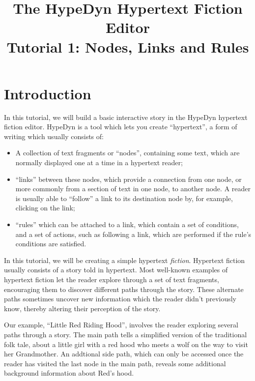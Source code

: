 \documentclass{article}
\begin{document}
\title{The HypeDyn Hypertext Fiction Editor\\Tutorial 1: Nodes, Links and Rules}
\date{}

\onecolumn
\maketitle

\tableofcontents


\section{Introduction}
In this tutorial, we will build a basic interactive story in the HypeDyn
hypertext fiction editor. HypeDyn is a tool which lets you create ``hypertext'',
a form of writing which usually consists of:

\begin{itemize}
  \item A collection of text fragments or ``nodes'', containing some text, which
  are normally displayed one at a time in a hypertext reader;
  \item ``links'' between these nodes, which provide a connection from one node,
  or more commonly from a section of text in one node, to another node. A reader
  is usually able to ``follow'' a link to its destination node by, for example,
  clicking on the link; 
  \item ``rules'' which can be attached to a link, which contain
  a set of conditions, and a set of actions, such as following a link, which
  are performed if the rule's conditions are satisfied.
\end{itemize}

In this tutorial, we will be creating a simple hypertext \textit{fiction}.
Hypertext fiction usually consists of a story told in hypertext. Most well-known
examples of hypertext fiction let the reader explore through a set of text
fragments, encouraging them to discover different paths through the story. These
alternate paths sometimes uncover new information which the reader didn't
previously know, thereby altering their perception of the story.

Our example, ``Little Red Riding Hood'', involves the reader exploring several
paths through a story. The main path tells a simplified version of the
traditional folk tale, about a little girl with a red hood who meets a wolf on
the way to visit her Grandmother. An addtional side path, which can only be accessed once
the reader has visited the last node in the main path, reveals some additional
background information about Red's hood.
\end{document}
